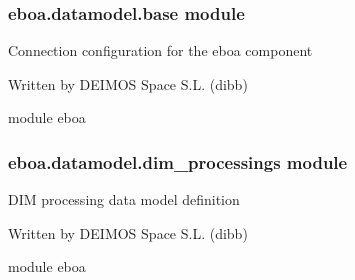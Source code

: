 \begin{fulllineitems}

\begin{fulllineitems}
\label{\detokenize{eboa.datamodel:eboa.datamodel.annotations.AnnotationTimestamp.parent_position}}
\end{fulllineitems}


\begin{fulllineitems}
\label{\detokenize{eboa.datamodel:eboa.datamodel.annotations.AnnotationTimestamp.value}}
\end{fulllineitems}


\end{fulllineitems}



\subsubsection{eboa.datamodel.base module}
\label{\detokenize{eboa.datamodel:module-eboa.datamodel.base}}\label{\detokenize{eboa.datamodel:eboa-datamodel-base-module}}
Connection configuration for the eboa component

Written by DEIMOS Space S.L. (dibb)

module eboa


\subsubsection{eboa.datamodel.dim\_processings module}
\label{\detokenize{eboa.datamodel:module-eboa.datamodel.dim_processings}}\label{\detokenize{eboa.datamodel:eboa-datamodel-dim-processings-module}}
DIM processing data model definition

Written by DEIMOS Space S.L. (dibb)

module eboa

